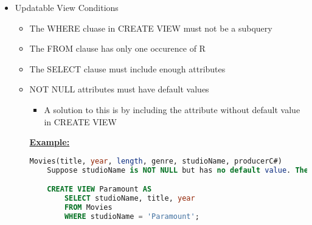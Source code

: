 \documentclass[12pt]{article}
\begin{document}
\begin{enumerate}[1.]
    \begin{itemize}
        \item Updatable View Conditions
        \begin{itemize}
            \item The WHERE cluase in CREATE VIEW must not be a subquery
            \item The FROM clause has only one occurence of R
            \item The SELECT clause must include enough attributes
            \item NOT NULL attributes must have default values
            \begin{itemize}
                \item A solution to this is by including the attribute without
                default value in CREATE VIEW
            \end{itemize}

            \bigskip

            \underline{\textbf{Example:}}

            \bigskip

    \begin{lstlisting}[language=SQL]
    Movies(title, year, length, genre, studioName, producerC#)
    Suppose studioName is NOT NULL but has no default value. Then, a fix is:

    CREATE VIEW Paramount AS
        SELECT studioName, title, year
        FROM Movies
        WHERE studioName = 'Paramount';
    \end{lstlisting}

        \end{itemize}
    \end{itemize}

\end{enumerate}
\end{document}
